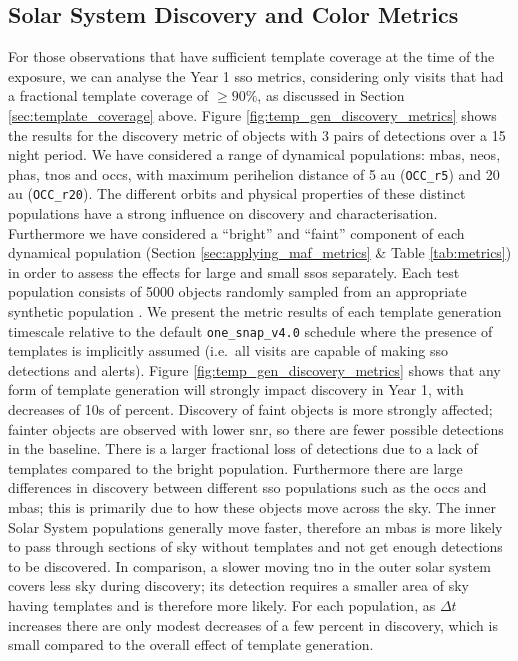 \documentclass[preprintm,linenumbers]{aastex631}
\newcommand{\baseline}{\texttt{one\_snap\_v4.0}\xspace}
\newcommand{\occrfive}{\texttt{OCC\_r5}\xspace}
\newcommand{\occrtwenty}{\texttt{OCC\_r20}\xspace}
\begin{document}
		\subsection{Solar System Discovery and Color Metrics}
		\label{sec:sso_metrics}
		    For those observations that have sufficient template coverage at the time of the exposure, we can analyse the Year 1 \gls*{sso} metrics, considering only visits that had a fractional template coverage of $\geq 90 \%$, as discussed in Section \ref{sec:template_coverage} above.	
		Figure \ref{fig:temp_gen_discovery_metrics} shows the results for the discovery metric of objects with 3 pairs of detections over a 15 night period.
		We have considered a range of dynamical populations: \glspl*{mba}, \glspl*{neo}, \glspl*{pha}, \glspl*{tno} and \glspl*{occ}, with maximum perihelion distance of 5 au (\occrfive) and 20 au (\occrtwenty).
  The different orbits and physical properties of these distinct populations have a strong influence on discovery and characterisation.
  Furthermore we have considered a ``bright'' and ``faint'' component of each dynamical population (Section \ref{sec:applying_maf_metrics} \& Table \ref{tab:metrics}) in order to assess the effects for large and small \glspl*{sso} separately.
		Each test population consists of 5000 objects randomly sampled from an appropriate synthetic population \cite[see Section 2.2 of][for more details of these simulated \glspl*{sso}]{schwambTuningLegacySurvey2023}.
		We present the metric results of each template generation timescale relative to the default \baseline schedule where the presence of templates is implicitly assumed (i.e.\ all visits are capable of making \gls*{sso} detections and alerts).
  Figure \ref{fig:temp_gen_discovery_metrics} shows that any form of template generation will strongly impact discovery in Year 1, with decreases of 10s of percent.
Discovery of faint objects is more strongly affected; fainter objects are observed with lower \gls*{snr}, so there are fewer possible detections in the baseline.
There is a larger fractional loss of detections due to a lack of templates compared to the bright population.
  Furthermore there are large differences in discovery between different \gls*{sso} populations such as the \glspl*{occ} and \glspl*{mba}; this is primarily due to how these objects move across the sky.
  The inner Solar System populations generally move faster, therefore an \glspl*{mba} is more likely to pass through sections of sky without templates and not get enough detections to be discovered.
  In comparison, a slower moving \gls*{tno} in the outer solar system covers less sky during discovery; its detection requires a smaller area of sky having templates and is therefore more likely.
  For each population, as $\Delta t$ increases there are only modest decreases of a few percent in discovery, which is small compared to the overall effect of template generation.
  
\end{document}

